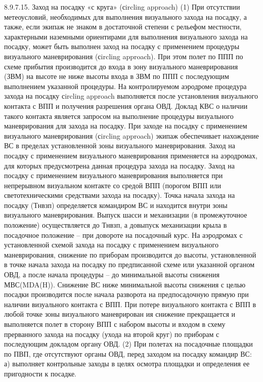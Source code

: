 8.9.7.15.	Заход на посадку «с круга» (сircling approach) 
(1) При отсутствии метеоусловий, необходимых для выполнения визуального захода на посадку, а также, если экипаж не знаком в достаточной степени с рельефом местности, характерными наземными ориентирами для выполнения визуального захода на посадку, может быть выполнен заход на посадку с применением процедуры визуального маневрирования (сircling approach). При этом полет по ППП по схеме прибытия производится до входа в зону визуального маневрирования (ЗВМ) на высоте не ниже высоты входа в ЗВМ по ППП с последующим выполнением указанной процедуры.
На контролируемом аэродроме процедура захода на посадку сircling approach выполняется после установления визуального контакта с ВПП и получения разрешения органа ОВД. Доклад КВС о наличии такого контакта является запросом на выполнение процедуры визуального маневрирования для захода на посадку.
При заходе на посадку с применением визуального маневрирования (сircling approach) экипаж обеспечивает нахождение ВС в пределах установленной зоны визуального маневрирования.
Заход на посадку с применением визуального маневрирования применяется на аэродромах, для которых предусмотрена данная процедура захода на посадку.
Заход на посадку с применением визуального маневрирования выполняется при непрерывном визуальном контакте со средой ВПП (порогом ВПП или светотехническими средствами захода на посадку).
Точка начала захода на посадку (Тнвзп) определяется командиром ВС и находится внутри зоны визуального маневрирования. Выпуск шасси и механизации (в промежуточное положение) осуществляется до Тнвзп, а довыпуск механизации крыла в посадочное положение – при довороте на посадочный курс.
На аэродромах с установленной схемой захода на посадку с применением визуального маневрирования, снижение по приборам производится до высоты, установленной в точке начала захода на посадку по предписанной схеме или указанной органом ОВД, а после начала процедуры – до минимальной высоты снижения МВС(MDA(H)).
Снижение ВС ниже минимальной высоты снижения с целью посадки производится после начала разворота на предпосадочную прямую при наличии визуального контакта с ВПП.
При потере визуального контакта с ВПП в любой точке зоны визуального маневрирован ия снижение прекращается и выполняется полет в сторону ВПП с набором высоты и входом в схему прерванного захода на посадку (ухода на второй круг) по приборам с последующим докладом органу ОВД.
(2) При полетах на посадочные площадки по ПВП, где отсутствуют органы ОВД, перед заходом на посадку командир ВС:
а)	выполняет контрольные заходы в целях осмотра площадки и определения ее пригодности к посадке.
